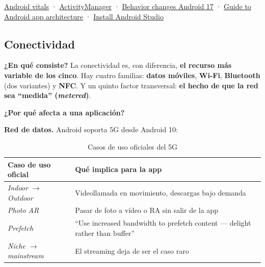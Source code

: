 \documentclass[11pt,a4paper]{article}
\newcommand{\campo}[1]{\textbf{\color{ink}#1}}
\begin{document}
	\begin{fuentesbox}
		\href{https://developer.android.com/topic/performance/vitals}{Android vitals} ·
		\href{https://developer.android.com/reference/android/app/ActivityManager}{ActivityManager} ·
		\href{https://developer.android.com/about/versions/17/behavior-changes-all}{Behavior changes Android 17} ·
		\href{https://developer.android.com/topic/libraries/architecture}{Guide to Android app architecture} ·
		\href{https://developer.android.com/studio/install}{Install Android Studio}
	\end{fuentesbox}
	
	\subsection{Conectividad}
	
	\campo{¿En qué consiste?}
	La conectividad es, con diferencia, \textbf{el recurso más variable de los cinco}. Hay cuatro familias: \textbf{datos móviles}, \textbf{Wi-Fi}, \textbf{Bluetooth} (dos variantes) y \textbf{NFC}. Y un quinto factor transversal: \textbf{el hecho de que la red sea \enquote{medida} (\emph{metered})}.
	
	\textbf{\color{primary}¿Por qué afecta a una aplicación?}
	
	\textbf{Red de datos.} Android soporta 5G desde Android 10:
	
	\begin{table}[htbp]
		\centering
		\small
		\begin{tabularx}{\textwidth}{@{}>{\RaggedRight\arraybackslash}p{4.5cm} >{\RaggedRight\arraybackslash}X@{}}
			\toprule
			\rowcolor{primary}
			\textcolor{paper}{\sffamily\bfseries Caso de uso oficial} & \textcolor{paper}{\sffamily\bfseries Qué implica para la app} \\
			\midrule
			\emph{Indoor $\to$ Outdoor} & Videollamada en movimiento, descargas bajo demanda \\
			\rowcolor{soft}
			\emph{Photo AR} & Pasar de foto a vídeo o RA sin salir de la app \\
			\emph{Prefetch} & \enquote{Use increased bandwidth to prefetch content --- delight rather than buffer} \\
			\rowcolor{soft}
			\emph{Niche $\to$ mainstream} & El streaming deja de ser el caso raro \\
			\bottomrule
		\end{tabularx}
		\caption{Casos de uso oficiales del 5G}
	\end{table}
	
\end{document}
